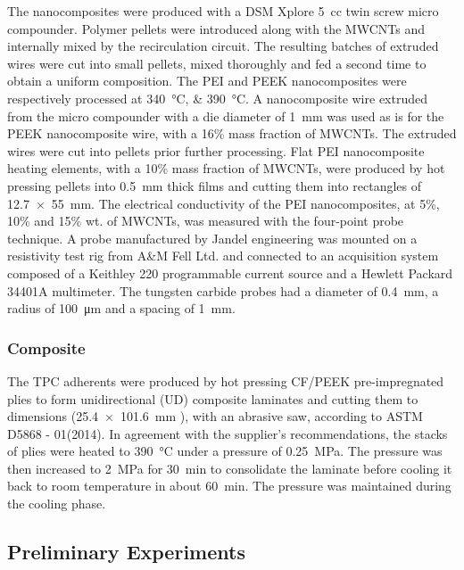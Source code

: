 \documentclass[11pt,review,times]{elsarticle}
\begin{document}
The nanocomposites were produced with a DSM Xplore \SI{5}{cc} twin screw micro compounder. 
Polymer pellets were introduced along with the MWCNTs and internally mixed by the recirculation circuit. 
The resulting batches of extruded wires were cut into small pellets, mixed thoroughly and fed a second time to obtain a uniform composition. 
The PEI and PEEK nanocomposites were respectively processed at \SIlist{340;390}{\celsius}. 
A nanocomposite wire extruded from the micro compounder with a die diameter of \SI{1}{\milli\metre} was used as is for the PEEK nanocomposite wire, with a 16\% mass fraction of MWCNTs. 
The extruded wires were cut into pellets prior further processing. 
Flat PEI nanocomposite heating elements, with a 10\% mass fraction of MWCNTs, were produced by hot pressing pellets into \SI{0.5}{\milli\metre} thick films and cutting them into rectangles of \SI{12.7 x 55}{\milli\metre}. 
The electrical conductivity of the PEI nanocomposites, at 5\%, 10\% and 15\% wt. of MWCNTs, was measured with the four-point probe technique. 
A probe manufactured by Jandel engineering was mounted on a resistivity test rig from A\&M Fell Ltd. and connected to an acquisition system composed of a Keithley 220 programmable current source and a Hewlett Packard 34401A multimeter. 
The tungsten carbide probes had a diameter of \SI{0.4}{\mm}, a radius of \SI{100}{\um} and a spacing of \SI{1}{\mm}. 

\subsubsection{Composite}

The TPC adherents were produced by hot pressing CF/PEEK pre-impregnated plies to form unidirectional (UD) composite laminates and cutting them to dimensions (\SI{25.4 x 101.6}{\milli\metre} ), with an abrasive saw, according to ASTM D5868 - 01(2014). 
In agreement with the supplier’s recommendations, the stacks of plies were heated to \SI{390}{\celsius} under a pressure of \SI{0.25}{\MPa}. 
The pressure was then increased to \SI{2}{\MPa} for \SI{30}{\minute} to consolidate the laminate before cooling it back to room temperature in about \SI{60}{\minute}. 
The pressure was maintained during the cooling phase. 

\subsection{Preliminary Experiments}
\end{document}
